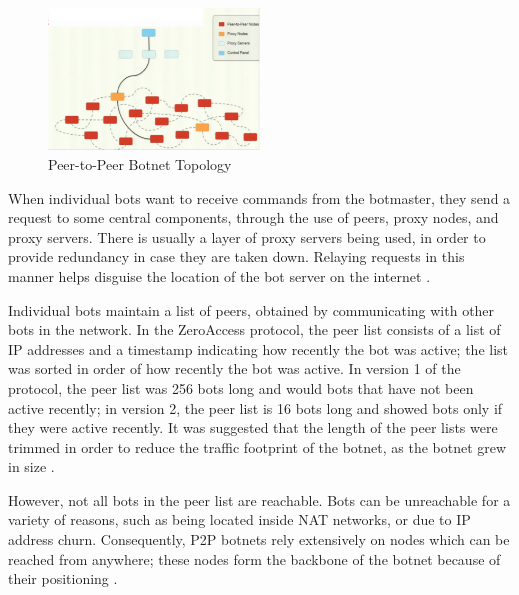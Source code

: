 \documentclass{acm_proc_article-sp}
\begin{document}
\begin{figure}[here]
\includegraphics[width=0.5\textwidth]{p2p-architecture.png}
\caption{Peer-to-Peer Botnet Topology}
\label{fig:p2p-architecture}
\end{figure}


When individual bots want to receive commands from the botmaster, they send a request to some central components, through the use of peers, proxy nodes, and proxy servers. There is usually a layer of proxy servers being used, in order to provide redundancy in case they are taken down. Relaying requests in this manner helps disguise the location of the bot server on the internet \cite{defcon:prowling}.

Individual bots maintain a list of peers, obtained by communicating with other bots in the network.  In the ZeroAccess protocol, the peer list consists of a list of IP addresses and a timestamp indicating how recently the bot was active; the list was sorted in order of how recently the bot was active. In version 1 of the protocol, the peer list was 256 bots long and would bots that have not been active recently; in version 2, the peer list is 16 bots long and showed bots only if they were active recently.  It was suggested that the length of the peer lists were trimmed in order to reduce the traffic footprint of the botnet, as the botnet grew in size  \cite{defcon:prowling}.  

However, not all bots in the peer list are reachable.  Bots can be unreachable for a variety of reasons, such as being located inside NAT networks, or due to IP address churn.   Consequently, P2P botnets rely extensively on nodes which can be reached from anywhere; these nodes form the backbone of the botnet because of their positioning \cite{defcon:prowling}.
\end{document}
